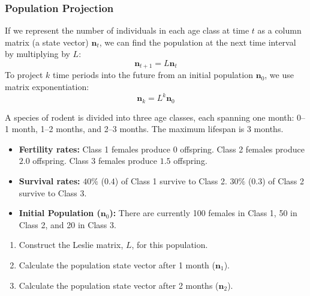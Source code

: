 \begin{center}
\end{center}

\subsubsection*{Population Projection}

If we represent the number of individuals in each age class at time $t$ as a column matrix (a state vector) $\mathbf{n}_t$, we can find the population at the next time interval by multiplying by $L$:
\[
\mathbf{n}_{t+1} = L \mathbf{n}_t
\]
To project $k$ time periods into the future from an initial population $\mathbf{n}_0$, we use matrix exponentiation:
\[
\mathbf{n}_{k} = L^k \mathbf{n}_0
\]

\bigskip

\begin{problem}
A species of rodent is divided into three age classes, each spanning one month: 0--1 month, 1--2 months, and 2--3 months. The maximum lifespan is 3 months.
\begin{itemize}
  \item \textbf{Fertility rates:} Class 1 females produce $0$ offspring. Class 2 females produce $2.0$ offspring. Class 3 females produce $1.5$ offspring.
  \item \textbf{Survival rates:} $40\%$ ($0.4$) of Class 1 survive to Class 2. $30\%$ ($0.3$) of Class 2 survive to Class 3.
  \item \textbf{Initial Population ($\mathbf{n}_0$):} There are currently 100 females in Class 1, 50 in Class 2, and 20 in Class 3.
\end{itemize}

\begin{enumerate}[label=\textbf{(\alph*)}]
  \item Construct the Leslie matrix, $L$, for this population.
  \item Calculate the population state vector after 1 month ($\mathbf{n}_1$).
  \item Calculate the population state vector after 2 months ($\mathbf{n}_2$).
\end{enumerate}
\end{problem}

